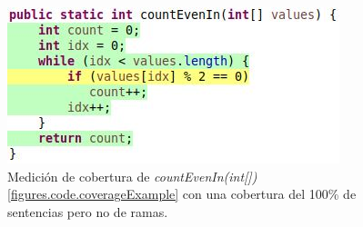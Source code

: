 \begin{figure}
	\includegraphics[width=\linewidth]{figures/branchCoverageExampleIncomplete.JPG}
	\caption{Medici\'on de cobertura de \emph{countEvenIn(int[])} \ref{figures.code.coverageExample} con una cobertura del 100\% de sentencias pero no de ramas.}
	\label{figures.examples.coverage.stmtCoverage}
\end{figure}

